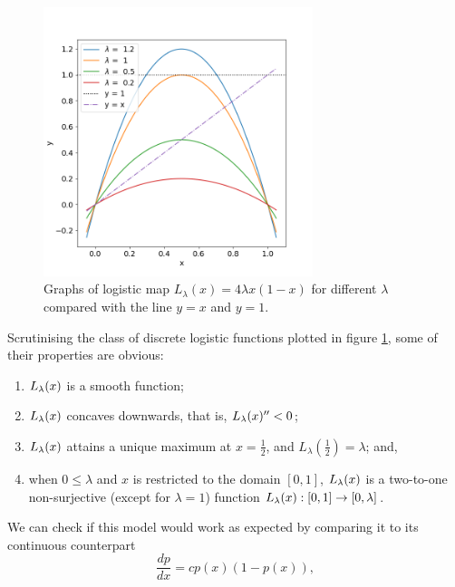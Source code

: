 \begin{figure}[t]
	\centering
	\includegraphics[width=0.7\textwidth]{./figures/logistic_map_diff_lambda.png}
	\caption{Graphs of logistic map $L_{\lambda}(x) = 4 \lambda x(1-x)$ for different $\lambda$ compared with the line $y=x$ and $y = 1$.} 
	\label{fig:logistic_map_diff_lambda}
\end{figure}


Scrutinising the class of discrete logistic functions plotted in figure \ref{fig:logistic_map_diff_lambda}, some of their properties are obvious:

\begin{enumerate}
	\item $L_{\lambda}(x)$ is a smooth function;
	\item $L_{\lambda}(x)$ concaves downwards, that is, $L_{\lambda}(x)'' < 0$;
	\item $L_{\lambda}(x)$ attains a unique maximum at $x = \frac{1}{2}$, and $L_{\lambda}(\frac{1}{2}) = \lambda$; and,
	\item when $0 \leq \lambda$ and $x$ is restricted to the domain $[0, 1]$, $L_{\lambda}(x)$ is a two-to-one non-surjective (except for $\lambda = 1$) function $L_{\lambda}(x): [0,1] \rightarrow [0,\lambda]$. 
\end{enumerate}


We can check if this model would work as expected by comparing it to its continuous counterpart 
\begin{equation}\label{eq_logistic_continuous}
	\frac{dp}{dx} = c p(x) (1-p(x)),
\end{equation}

